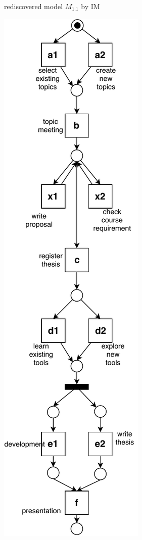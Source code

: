 \begin{figure}[htp]
\begin{subfigure}[b]{0.48\textwidth}
		\caption{rediscovered model $M_{1.1}$ by IM}
		\label{fig:demo_s1_IM}
	\end{subfigure}
	\begin{subfigure}[b]{0.48\textwidth}
		\centering
		\includegraphics[width=0.8\linewidth, height=0.8\textheight]{figures/introduction/thesis-demo-s1-fahland.pdf}

\end{subfigure}
\end{figure}
